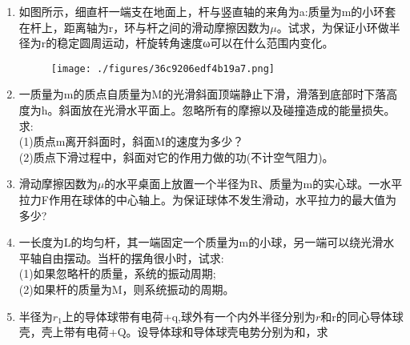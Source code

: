 \begin{enumerate}
\item 如图所示，细直杆一端支在地面上，杆与竖直轴的来角为a:质量为m的小环套在杆上，距离轴为r，环与杆之间的滑动摩擦因数为$\mu$。试求，为保证小环做半径为r的稳定圆周运动，杆旋转角速度ω可以在什么范围内变化。
\begin{figure}[ht]
\centering
\texttt{[image: ./figures/36c9206edf4b19a7.png]}
\caption{} \label{fig_SSD11_1}
\end{figure}
\item 一质量为m的质点自质量为M的光滑斜面顶端静止下滑，滑落到底部时下落高度为h。斜面放在光滑水平面上。忽略所有的摩擦以及碰撞造成的能量损失。求:\\
(1)质点m离开斜面时，斜面M的速度为多少？\\
(2)质点下滑过程中，斜面对它的作用力做的功(不计空气阻力)。
\item 滑动摩擦因数为$\mu$的水平桌面上放置一个半径为R、质量为m的实心球。一水平拉力F作用在球体的中心轴上。为保证球体不发生滑动，水平拉力的最大值为多少?
\item 一长度为L的均匀杆，其一端固定一个质量为m的小球，另一端可以绕光滑水平轴自由摆动。当杆的摆角很小时，试求:\\
(1)如果忽略杆的质量，系统的振动周期;\\
(2)如果杆的质量为M，则系统振动的周期。
\item 半径为$r_1$上的导体球带有电荷+q,球外有一个内外半径分别为$r$和r的同心导体球壳，壳上带有电荷+Q。设导体球和导体球壳电势分别为和，求
\end{enumerate}
